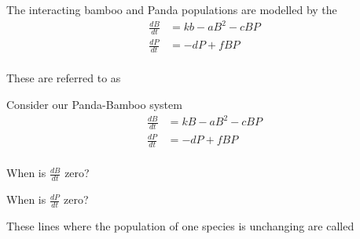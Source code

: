 \begin{applicationActivities}
\begin{observation}
The interacting bamboo and Panda populations are modelled by the 
\begin{alignat*}{2}
\frac{dB}{dt} &= kb-aB^2-cBP\\
\frac{dP}{dt} &= -dP+fBP \\
\end{alignat*}

\vfill
These are referred to as 
\end{observation}

\begin{activity}{10}
Consider our Panda-Bamboo system
\begin{alignat*}{2}
\frac{dB}{dt} &= kB-aB^2-cBP\\
\frac{dP}{dt} &= -dP+fBP \\
\end{alignat*}
\begin{subactivity}
When is \(\frac{dB}{dt}\) zero?
\end{subactivity}
\begin{subactivity}
When is \(\frac{dP}{dt}\) zero?
\end{subactivity}
\end{activity}

\begin{observation}
These lines where the population of one species is unchanging are called 

\begin{center}
\end{center}

\end{observation}


\end{applicationActivities}
